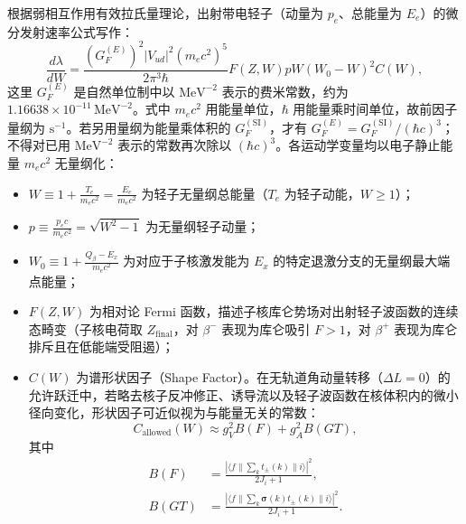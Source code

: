 根据弱相互作用有效拉氏量理论，出射带电轻子（动量为 $p_e$、总能量为 $E_e$）的微分发射速率公式写作：
\begin{equation}\label{eq:4-7-differential-spectrum}
\frac{d\lambda}{dW} = \frac{(G_F^{(E)})^2 |V_{ud}|^2 (m_e c^2)^5}{2\pi^3 \hbar} F(Z, W) p W (W_0 - W)^2 C(W),
\end{equation}
这里 $G_F^{(E)}$ 是自然单位制中以 $\mathrm{MeV}^{-2}$ 表示的费米常数，约为 $1.16638\times10^{-11}\,\mathrm{MeV}^{-2}$。式中 $m_e c^2$ 用能量单位，$\hbar$ 用能量乘时间单位，故前因子量纲为 $\mathrm{s}^{-1}$。若另用量纲为能量乘体积的 $G_F^{(\mathrm{SI})}$，才有 $G_F^{(E)}=G_F^{(\mathrm{SI})}/(\hbar c)^3$；不得对已用 $\mathrm{MeV}^{-2}$ 表示的常数再次除以 $(\hbar c)^3$。各运动学变量均以电子静止能量 $m_e c^2$ 无量纲化：
\begin{itemize}
\item $W \equiv 1 + \frac{T_e}{m_e c^2} = \frac{E_e}{m_e c^2}$ 为轻子无量纲总能量（$T_e$ 为轻子动能，$W \ge 1$）；
\item $p \equiv \frac{p_e c}{m_e c^2} = \sqrt{W^2 - 1}$ 为无量纲轻子动量；
\item $W_0 \equiv 1 + \frac{Q_\beta - E_x}{m_e c^2}$ 为对应于子核激发能为 $E_x$ 的特定退激分支的无量纲最大端点能量；
\item $F(Z, W)$ 为相对论 Fermi 函数，描述子核库仑势场对出射轻子波函数的连续态畸变（子核电荷取 $Z_{\mathrm{final}}$，对 $\beta^-$ 表现为库仑吸引 $F > 1$，对 $\beta^+$ 表现为库仑排斥且在低能端受阻遏）；
\item $C(W)$ 为谱形状因子（Shape Factor）。在无轨道角动量转移（$\Delta L = 0$）的允许跃迁中，若略去核子反冲修正、诱导流以及轻子波函数在核体积内的微小径向变化，形状因子可近似视为与能量无关的常数：
\begin{equation}\label{eq:4-7-shape-factor-allowed}
C_{\mathrm{allowed}}(W) \approx g_V^2 B(F) + g_A^2 B(GT),
\end{equation}
其中
\[
\begin{aligned}
 B(F)&=\frac{|\langle f\|\sum_k t_\pm(k)\|i\rangle|^2}{2J_i+1},\\
 B(GT)&=\frac{|\langle f\|\sum_k\boldsymbol\sigma(k)t_\pm(k)\|i\rangle|^2}{2J_i+1}.
\end{aligned}
\]

\end{itemize}
